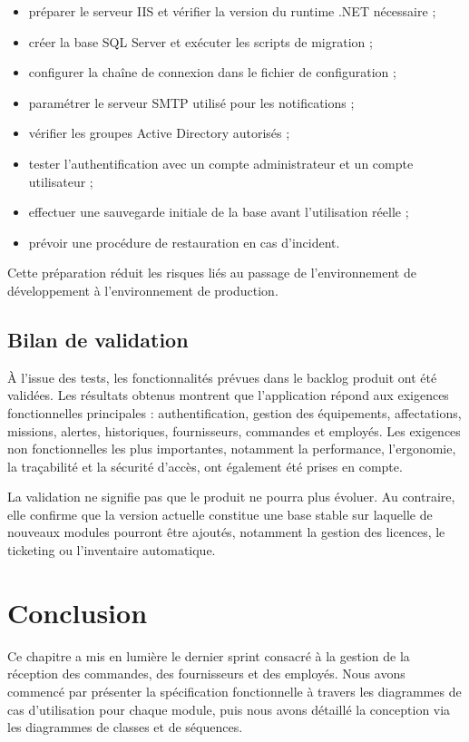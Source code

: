 \begin{itemize}[label=\textbullet,font=\normalsize]
    \item préparer le serveur IIS et vérifier la version du runtime .NET nécessaire ;
    \item créer la base SQL Server et exécuter les scripts de migration ;
    \item configurer la chaîne de connexion dans le fichier de configuration ;
    \item paramétrer le serveur SMTP utilisé pour les notifications ;
    \item vérifier les groupes Active Directory autorisés ;
    \item tester l'authentification avec un compte administrateur et un compte utilisateur ;
    \item effectuer une sauvegarde initiale de la base avant l'utilisation réelle ;
    \item prévoir une procédure de restauration en cas d'incident.
\end{itemize}

Cette préparation réduit les risques liés au passage de l'environnement de développement à l'environnement de production.

\subsection{Bilan de validation}

À l'issue des tests, les fonctionnalités prévues dans le backlog produit ont été validées. Les résultats obtenus montrent que l'application répond aux exigences fonctionnelles principales : authentification, gestion des équipements, affectations, missions, alertes, historiques, fournisseurs, commandes et employés. Les exigences non fonctionnelles les plus importantes, notamment la performance, l'ergonomie, la traçabilité et la sécurité d'accès, ont également été prises en compte.

La validation ne signifie pas que le produit ne pourra plus évoluer. Au contraire, elle confirme que la version actuelle constitue une base stable sur laquelle de nouveaux modules pourront être ajoutés, notamment la gestion des licences, le ticketing ou l'inventaire automatique.

\section*{Conclusion}
Ce chapitre a mis en lumière le dernier sprint consacré à la gestion de la réception des commandes, des fournisseurs et des employés. Nous avons commencé par présenter la spécification fonctionnelle à travers les diagrammes de cas d'utilisation pour chaque module, puis nous avons détaillé la conception via les diagrammes de classes et de séquences.

